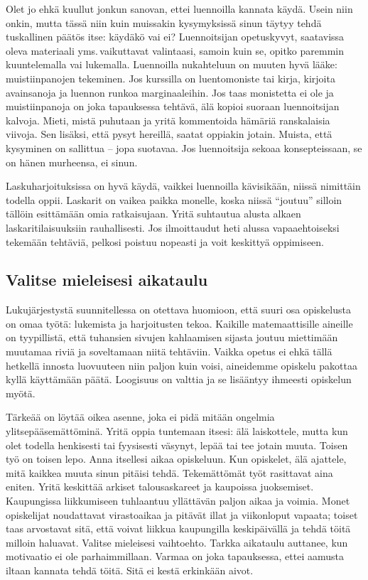 \documentclass[a5paper, 8pt, twocolumn]{book} %
\numberwithin{equation}{section}
\begin{document}
Olet jo ehkä kuullut jonkun sanovan,
ettei luennoilla kannata käydä. Usein niin
onkin, mutta tässä niin kuin muissakin kysymyksissä
sinun täytyy tehdä tuskallinen
päätös itse: käydäkö vai ei? Luennoitsijan
opetuskyvyt, saatavissa oleva materiaali
yms.\,vaikuttavat valintaasi, samoin kuin
se, opitko paremmin kuuntelemalla vai lukemalla.
Luennoilla nukahteluun on muuten
hyvä lääke: muistiinpanojen tekeminen.
Jos kurssilla on luentomoniste tai
kirja, kirjoita avainsanoja ja luennon runkoa
marginaaleihin. Jos taas monistetta ei ole ja muistiinpanoja on joka tapauksessa
tehtävä,
älä kopioi suoraan luennoitsijan
kalvoja.
Mieti, mistä puhutaan ja yritä
kommentoida
hämäriä ranskalaisia viivoja.
Sen lisäksi, että pysyt hereillä, saatat
oppiakin jotain. Muista, että kysyminen on
sallittua -- jopa suotavaa. Jos luennoitsija
sekoaa konsepteissaan, se on hänen murheensa,
ei sinun.

Laskuharjoituksissa on hyvä käydä,
vaikkei luennoilla kävisikään, niissä nimittäin
todella oppii. Laskarit on vaikea paikka
monelle, koska niissä ``joutuu'' silloin
tällöin esittämään omia ratkaisujaan. Yritä
suhtautua alusta alkaen laskaritilaisuuksiin
rauhallisesti. Jos ilmoittaudut heti alussa
vapaaehtoiseksi tekemään tehtäviä, pelkosi
poistuu nopeasti ja voit keskittyä oppimiseen.

\subsection*{Valitse mieleisesi aikataulu}
Lukujärjestystä suunnitellessa on otettava
huomioon, että suuri osa opiskelusta on
omaa työtä: lukemista ja harjoitusten tekoa.
Kaikille matemaattisille aineille on tyypillistä,
että tuhansien sivujen kahlaamisen
sijasta
joutuu miettimään muutamaa riviä ja
soveltamaan niitä tehtäviin. Vaikka opetus
ei ehkä tällä hetkellä innosta luovuuteen
niin paljon kuin voisi, aineidemme opiskelu
pakottaa kyllä käyttämään päätä. Loogisuus
on valttia ja se lisääntyy ihmeesti
opiskelun myötä.

Tärkeää on löytää oikea asenne, joka ei
pidä mitään ongelmia ylitse\-pääsemättöminä.
Yritä oppia tuntemaan itsesi: älä
laiskottele,
mutta kun olet todella henkisesti
tai fyysisesti väsynyt, lepää tai tee jotain
muuta.
Toisen työ on toisen lepo. Anna itsellesi
aikaa opiskeluun. Kun opiskelet, älä
ajattele,
mitä kaikkea muuta sinun pitäisi
tehdä. Tekemättömät työt rasittavat aina
eniten. Yritä keskittää arkiset talousaskareet
ja kaupoissa juoksemiset. Kaupungissa
liikkumiseen tuhlaantuu yllättävän paljon
aikaa ja voimia. Monet opiskelijat noudattavat
virastoaikaa ja pitävät illat ja viikonloput
vapaata; toiset taas arvostavat sitä,
että voivat liikkua kaupungilla keskipäivällä
ja tehdä töitä milloin haluavat. Valitse
mieleisesi vaihtoehto. Tarkka aikataulu
auttanee, kun motivaatio ei ole parhaimmillaan.
Varmaa on joka tapauksessa, ettei
aamusta iltaan kannata tehdä töitä. Sitä ei
kestä erkinkään aivot.
\end{document}
